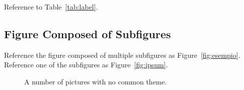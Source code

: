 \documentclass[
12pt, %
a4paper, %
oneside, %
headinclude,footinclude, %
BCOR5mm, %
german]{scrartcl}
\begin{document}
Reference to Table~\vref{tab:label}. %


\subsection{Figure Composed of Subfigures}

Reference the figure composed of multiple subfigures as Figure~\vref{fig:esempio}. Reference one of the subfigures as Figure~\vref{fig:ipsum}. %

\lipsum[15-18] %

\begin{figure}[tb]
\centering
\caption[A number of pictures.]{A number of pictures with no common theme.} %
\label{fig:esempio}
\end{figure}


\renewcommand{\refname}{\spacedlowsmallcaps{References}} %




\end{document}
